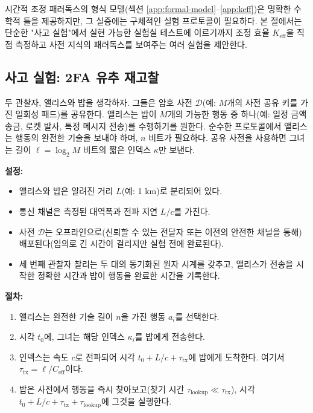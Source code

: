 \documentclass[12pt,a4paper]{article}
\begin{document}
	시간적 조정 패러독스의 형식 모델(섹션 \ref{app:formal-model}--\ref{app:keff})은 명확한 수학적 틀을 제공하지만, 그 실증에는 구체적인 실험 프로토콜이 필요하다. 본 절에서는 단순한 "사고 실험"에서 실현 가능한 실험실 테스트에 이르기까지 조정 효율 \(K_{\mathrm{eff}}\)을 직접 측정하고 사전 지식의 패러독스를 보여주는 여러 실험을 제안한다.
	
	\subsection{사고 실험: 2FA 유추 재고찰}
	\label{subsec:thought-2fa}
	
	두 관찰자, 앨리스와 밥을 생각하자. 그들은 암호 사전 \(\mathcal{D}\)(예: \(M\)개의 사전 공유 키를 가진 일회성 패드)를 공유한다. 앨리스는 밥이 \(M\)개의 가능한 행동 중 하나(예: 일정 금액 송금, 로켓 발사, 특정 메시지 전송)를 수행하기를 원한다. 순수한 프로토콜에서 앨리스는 행동의 완전한 기술을 보내야 하며, \(n\) 비트가 필요하다. 공유 사전을 사용하면 그녀는 길이 \(\ell = \log_2 M\) 비트의 짧은 인덱스 \(\kappa\)만 보낸다.
	
	\textbf{설정:}
	\begin{itemize}
		\item 앨리스와 밥은 알려진 거리 \(L\)(예: 1 km)로 분리되어 있다.
		\item 통신 채널은 측정된 대역폭과 전파 지연 \(L/c\)를 가진다.
		\item 사전 \(\mathcal{D}\)는 오프라인으로(신뢰할 수 있는 전달자 또는 이전의 안전한 채널을 통해) 배포된다(임의로 긴 시간이 걸리지만 실험 전에 완료된다).
		\item 세 번째 관찰자 찰리는 두 대의 동기화된 원자 시계를 갖추고, 앨리스가 전송을 시작한 정확한 시간과 밥이 행동을 완료한 시간을 기록한다.
	\end{itemize}
	
	\textbf{절차:}
	\begin{enumerate}
		\item 앨리스는 완전한 기술 길이 \(n\)을 가진 행동 \(a_i\)를 선택한다.
		\item 시각 \(t_0\)에, 그녀는 해당 인덱스 \(\kappa_i\)를 밥에게 전송한다.
		\item 인덱스는 속도 \(c\)로 전파되어 시각 \(t_0 + L/c + \tau_{\text{tx}}\)에 밥에게 도착한다. 여기서 \(\tau_{\text{tx}} = \ell / C_{\text{eff}}\)이다.
		\item 밥은 사전에서 행동을 즉시 찾아보고(찾기 시간 \(\tau_{\text{lookup}} \ll \tau_{\text{tx}}\)), 시각 \(t_0 + L/c + \tau_{\text{tx}} + \tau_{\text{lookup}}\)에 그것을 실행한다.
	\end{enumerate}
	
\end{document}
